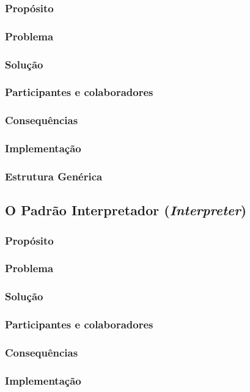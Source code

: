 \documentclass[
	11pt,				%
	openright,
	twoside,			%
	a4paper,			%
	english,			%
	french,
	brazil,				%
	sumario=tradicional
	]{abntex2}
\begin{document}
\subsubsection{Propósito}
\subsubsection{Problema}
\subsubsection{Solução}
\subsubsection{Participantes e colaboradores}
\subsubsection{Consequências}
\subsubsection{Implementação}
\subsubsection{Estrutura Genérica}

\subsection{O Padrão Interpretador (\textit{Interpreter})}
\subsubsection{Propósito}
\subsubsection{Problema}
\subsubsection{Solução}
\subsubsection{Participantes e colaboradores}
\subsubsection{Consequências}
\subsubsection{Implementação}
\end{document}
